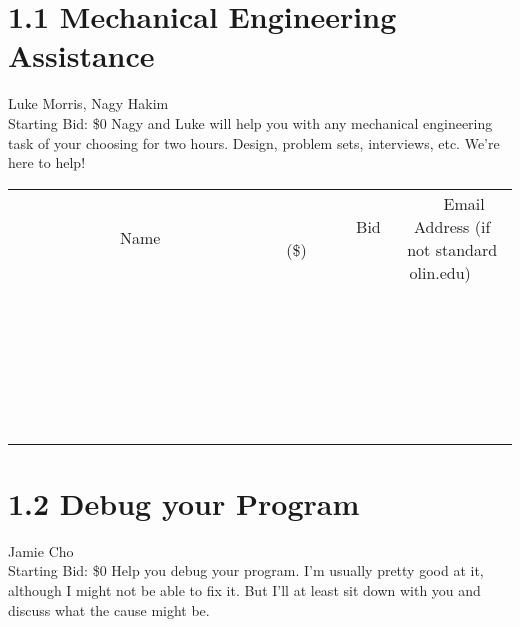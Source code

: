 \documentclass[11pt]{article}
\begin{document}
\section*{1.1 Mechanical Engineering Assistance}
Luke Morris, Nagy Hakim
\\
Starting Bid: \$0
\newline
Nagy and Luke will help you with any mechanical engineering task of your choosing for two hours. Design, problem sets, interviews, etc. We're here to help!
\\[6ex]
\begin{tabular}{c c c}
~~~~~~~~~~~~~Name~~~~~~~~~~~~~ & ~~~~~~~~~Bid (\$)~~~~~~~~~  & ~~~Email Address (if not standard olin.edu)~~~\\
 & & \\
\hline
 & & \\
\hline
 & & \\
\hline
 & & \\
\hline
 & & \\
\hline
 & & \\
\hline
 & & \\
\hline
 & & \\
\hline
 & & \\
\hline
 & & \\
\hline
 & & \\
\hline
 & & \\
\hline
 & & \\
\hline
 & & \\
\hline
 & & \\
\hline
 & & \\
\hline
 & & \\
\hline
 & & \\
\hline
 & & \\
\hline
 & & \\
\hline
 & & \\
\hline
 & & \\
\hline
 & & \\
\hline
 & & \\
\hline
 & & \\
\hline
 & & \\
\hline
\end{tabular}
\newpage
\section*{1.2 Debug your Program}
Jamie Cho
\\
Starting Bid: \$0
\newline
Help you debug your program. I'm usually pretty good at it, although I might not be able to fix it. But I'll at least sit down with you and discuss what the cause might be.
\end{document}
